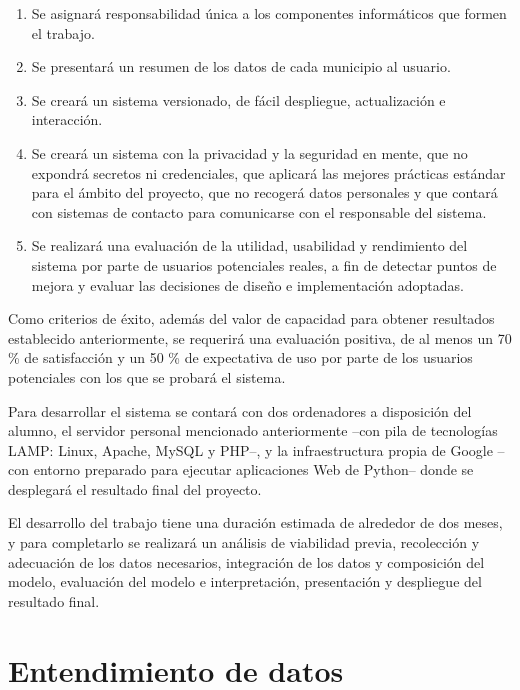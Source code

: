\begin{enumerate}
    \item Se asignará responsabilidad única a los componentes informáticos que formen el trabajo.
    \item Se presentará un resumen de los datos de cada municipio al usuario.
    \item Se creará un sistema versionado, de fácil despliegue, actualización e interacción.
    \item Se creará un sistema con la privacidad y la seguridad en mente, que no expondrá secretos ni credenciales, que aplicará las mejores prácticas estándar para el ámbito del proyecto, que no recogerá datos personales y que contará con sistemas de contacto para comunicarse con el responsable del sistema.
    \item Se realizará una evaluación de la utilidad, usabilidad y rendimiento del sistema por parte de usuarios potenciales reales, a fin de detectar puntos de mejora y evaluar las decisiones de diseño e implementación adoptadas.
\end{enumerate}

Como criterios de éxito, además del valor de capacidad para obtener resultados establecido anteriormente, se requerirá una evaluación positiva, de al menos un 70 \% de satisfacción y un 50 \% de expectativa de uso por parte de los usuarios potenciales con los que se probará el sistema.

Para desarrollar el sistema se contará con dos ordenadores a disposición del alumno, el servidor personal mencionado anteriormente –con pila de tecnologías LAMP: Linux, Apache, MySQL y PHP–, y la infraestructura propia de Google –con entorno preparado para ejecutar aplicaciones Web de Python– donde se desplegará el resultado final del proyecto.

El desarrollo del trabajo tiene una duración estimada de alrededor de dos meses, y para completarlo se realizará un análisis de viabilidad previa, recolección y adecuación de los datos necesarios, integración de los datos y composición del modelo, evaluación del modelo e interpretación, presentación y despliegue del resultado final.

\section{Entendimiento de datos}

